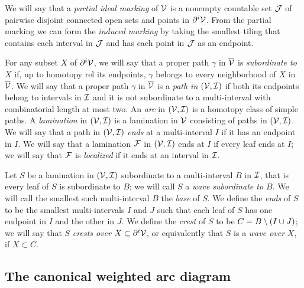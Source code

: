 \documentclass[12pt]{amsart}
\begin{document}
We will say that a \textit{partial ideal marking}  of $\mathcal V$ is a nonempty countable set $\mathcal J$ of pairwise disjoint connected open sets and points in $\partial^i\mathcal V$.  From the partial marking we can form the \textit{induced marking}
 by taking the smallest tiling that contains each interval in $\mathcal J$ and has each point in $\mathcal J$ as an endpoint. 

For any subset $X$ of $\partial^i \mathcal V$, 
we will say that a proper path $\gamma$ in $\overline {\mathcal V}$ is \textit{subordinate to $X$}  if, up to homotopy rel its endpoints, $\gamma$ belongs to every neighborhood of $X$ in $\overline{\mathcal V}$. 
We will say that a proper path $\gamma$ in $\overline{\mathcal V}$ is a \textit{path in $(\mathcal V, \mathcal I)$} if both its endpoints belong to intervals in $\mathcal I$ and it is not subordinate to a multi-interval with combinatorial length at most two.
An \textit{arc}  in $(\mathcal V, \mathcal I)$ is a homotopy class of simple paths.
A \textit{lamination}  in $(\mathcal V, \mathcal I)$ is a lamination in $\mathcal V$ consisting  of paths in $(\mathcal V, \mathcal I)$. We will say that a path 
in $(\mathcal V, \mathcal I)$ \textit{ends}  at a multi-interval $I$ if it has an endpoint in $I$. We will say that a lamination $\mathcal F$ in $(\mathcal V, \mathcal I)$ ends at $I$ if every leaf ends at $I$; we will say that $\mathcal F$ is \textit{localized}   if it ends at an interval in $\mathcal I$. 

Let $S$ be a lamination in $(\mathcal V, \mathcal I)$ subordinate to a multi-interval $B$ in $\mathcal I$, that is every leaf of $S$ is subordinate to $B$; we will call $S$ a \textit{wave subordinate to $B$}.  We will call the smallest such multi-interval $B$ the \textit{base}   of $S$. We define the \textit{ends} 
 of $S$ to be the smallest multi-intervals $I$ and $J$ such that each leaf of $S$ has one endpoint in $I$ and the other in $J$. We define the \textit{crest}  of $S$ to be $C= B\setminus (I\cup J)$; we will say that $S$ \textit{crests over} $X\subset \partial^i \mathcal V$, or equivalently that $S$ is a \textit{wave over} $X$, if $X\subset C$.


\subsection{The canonical weighted arc diagram}
\end{document}

